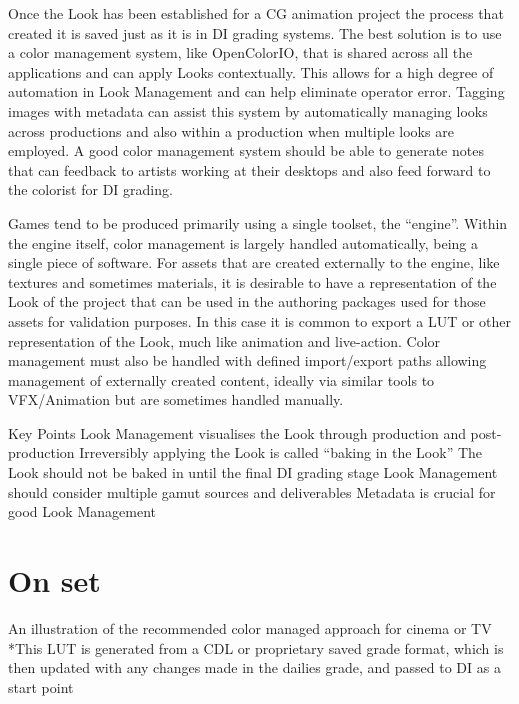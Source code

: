 Once the Look has been established for a CG animation project the process that created it is saved just as it is in DI grading systems. The best solution is to use a color management system, like OpenColorIO, that is shared across all the applications and can apply Looks contextually. This allows for a high degree of automation in Look Management and can help eliminate operator error. Tagging images with metadata can assist this system by automatically managing looks across productions and also within a production when multiple looks are employed. A good color management system should be able to generate notes that can feedback to artists working at their desktops and also feed forward to the colorist for DI grading.

Games tend to be produced primarily using a single toolset, the “engine”. Within the engine itself, color management is largely handled automatically, being a single piece of software. For assets that are created externally to the engine, like textures and sometimes materials, it is desirable to have a representation of the Look of the project that can be used in the authoring packages used for those assets for validation purposes. In this case it is common to export a LUT or other representation of the Look, much like animation and live-action. Color management must also be handled with defined import/export paths allowing management of externally created content, ideally via similar tools to VFX/Animation but are sometimes handled manually.

Key Points
Look Management visualises the Look through production and post-production
Irreversibly applying the Look is called “baking in the Look”
The Look should not be baked in until the final DI grading stage
Look Management should consider multiple gamut sources and deliverables
Metadata is crucial for good Look Management

 
\section{On set}

An illustration of the recommended color managed approach for cinema or TV
*This LUT is generated from a CDL or proprietary saved grade format, which is then updated with any changes made in the dailies grade, and passed to DI as a start point


